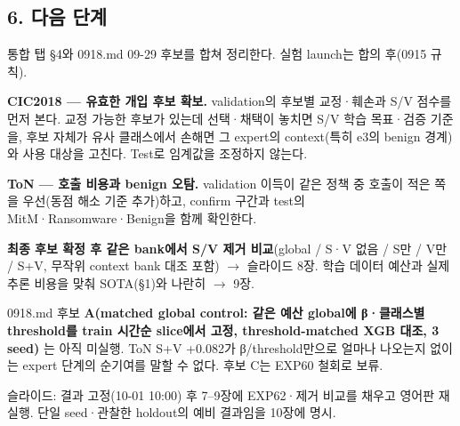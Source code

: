 \subsection{6. 다음 단계}
통합 탭 §4와 0918.md 09-29 후보를 합쳐 정리한다. 실험 launch는 합의 후(0915 규칙).

\par\noindent \textbullet\enspace \textbf{CIC2018 — 유효한 개입 후보 확보.} validation의 후보별 교정·훼손과 S/\allowbreak{}V 점수를 먼저 본다. 교정 가능한 후보가 있는데 선택·채택이 놓치면 S/\allowbreak{}V 학습 목표·검증 기준을, 후보 자체가 유사 클래스에서 손해면 그 expert의 context(특히 e3의 benign 경계)와 사용 대상을 고친다. Test로 임계값을 조정하지 않는다.


\par\noindent \textbullet\enspace \textbf{ToN — 호출 비용과 benign 오탐.} validation 이득이 같은 정책 중 호출이 적은 쪽을 우선(동점 해소 기준 추가)하고, confirm 구간과 test의 MitM·Ransomware·Benign을 함께 확인한다.


\par\noindent \textbullet\enspace \textbf{최종 후보 확정 후 같은 bank에서 S/\allowbreak{}V 제거 비교}(global /\allowbreak{} S·V 없음 /\allowbreak{} S만 /\allowbreak{} V만 /\allowbreak{} S+\allowbreak{}V, 무작위 context bank 대조 포함)  \ensuremath{\rightarrow}  슬라이드 8장. 학습 데이터 예산과 실제 추론 비용을 맞춰 SOTA(§1)와 나란히  \ensuremath{\rightarrow}  9장.


\par\noindent \textbullet\enspace 0918.md 후보 \textbf{A(matched global control: 같은 예산 global에 β·클래스별 threshold를 train 시간순 slice에서 고정, threshold-matched XGB 대조, 3 seed)} 는 아직 미실행. ToN S+\allowbreak{}V +\allowbreak{}0.082가 β/\allowbreak{}threshold만으로 얼마나 나오는지 없이는 expert 단계의 순기여를 말할 수 없다. 후보 C는 EXP60 철회로 보류.


\par\noindent \textbullet\enspace 슬라이드: 결과 고정(10-01 10:00) 후 7–9장에 EXP62·제거 비교를 채우고 영어판 재실행. 단일 seed·관찰한 holdout의 예비 결과임을 10장에 명시.


